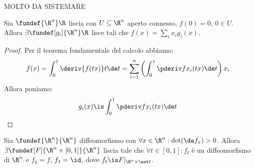 
MOLTO DA SISTEMARE

\begin{lemma}
	\label{th:lemprec}
	Sia $\fundef{\R^n}\R$ liscia con $U\subseteq\R^n$ aperto connesso, $f(0)=0$, $0\in U$.
	Allora $\exists\fundef[g_i]{\R^n}\R$ lisce tali che $f(x)=\sum_ix_ig_i(x)$.
\end{lemma}

\begin{proof}
	Per il teorema fondamentale del calcolo abbiamo:
	\[f(x)=\int_0^1\deriv{f(tx)}t\de t=
	\sum_{i=1}^n\left(\int_0^1\pderiv f{x_i}(tx)\de t\right)x_i\]
	Allora poniamo:
	\[g_i(x)\is\int_0^1\pderiv f{x_i}(tx)\de t
	\qedhere\]
\end{proof}

\begin{teo}
	Sia $\fundef{\R^n}{\R^n}$ diffeomorfismo con $\forall x\in\R^n:\det(\de f_{x})>0$. Allora $\exists\fundef[F]{\R^n\times[0,1]}{\R^n}$ liscia tale che $\forall t\in[0,1]:f_t$ è un diffeomorfismo di $\R^n$ e $f_0=f$, $f_1=\id$, dove $f_t\is F|_{\R^n\times\set t}$.
\end{teo}

